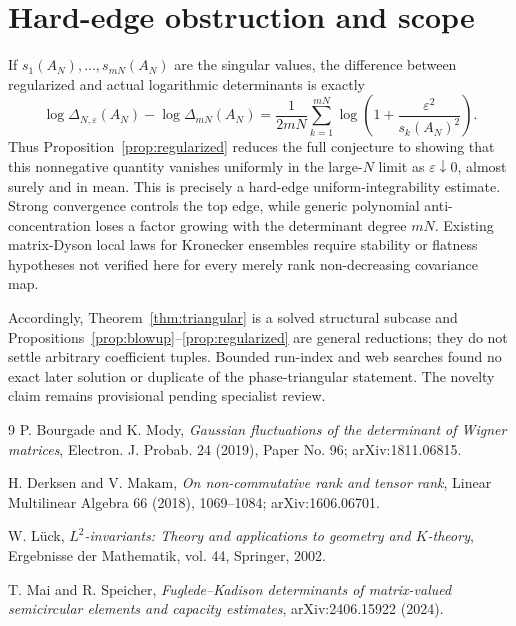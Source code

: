 \documentclass[11pt]{article}
\newcommand{\D}{\Delta}
\begin{document}
\section{Hard-edge obstruction and scope}

If $s_1(A_N),\ldots,s_{mN}(A_N)$ are the singular values, the difference
between regularized and actual logarithmic determinants is exactly
\[
 \log\D_{N,\varepsilon}(A_N)-\log\D_{mN}(A_N)
 =\frac1{2mN}\sum_{k=1}^{mN}
   \log\!\left(1+\frac{\varepsilon^2}{s_k(A_N)^2}\right).
\]
Thus Proposition~\ref{prop:regularized} reduces the full conjecture to showing
that this nonnegative quantity vanishes uniformly in the large-$N$ limit as
$\varepsilon\downarrow0$, almost surely and in mean.  This is precisely a
hard-edge uniform-integrability estimate.  Strong convergence controls the
top edge, while generic polynomial anti-concentration loses a factor growing
with the determinant degree $mN$.  Existing matrix-Dyson local laws for
Kronecker ensembles require stability or flatness hypotheses not verified here
for every merely rank non-decreasing covariance map.

Accordingly, Theorem~\ref{thm:triangular} is a solved structural subcase and
Propositions~\ref{prop:blowup}--\ref{prop:regularized} are general reductions;
they do not settle arbitrary coefficient tuples.  Bounded run-index and web
searches found no exact later solution or duplicate of the phase-triangular
statement.  The novelty claim remains provisional pending specialist review.

\begin{thebibliography}{9}
P. Bourgade and K. Mody,
\emph{Gaussian fluctuations of the determinant of Wigner matrices},
Electron. J. Probab. 24 (2019), Paper No. 96; arXiv:1811.06815.

H. Derksen and V. Makam,
\emph{On non-commutative rank and tensor rank},
Linear Multilinear Algebra 66 (2018), 1069--1084; arXiv:1606.06701.

W. L\"uck,
\emph{$L^2$-invariants: Theory and applications to geometry and $K$-theory},
Ergebnisse der Mathematik, vol. 44, Springer, 2002.

T. Mai and R. Speicher,
\emph{Fuglede--Kadison determinants of matrix-valued semicircular elements and
capacity estimates}, arXiv:2406.15922 (2024).
\end{thebibliography}
\end{document}
